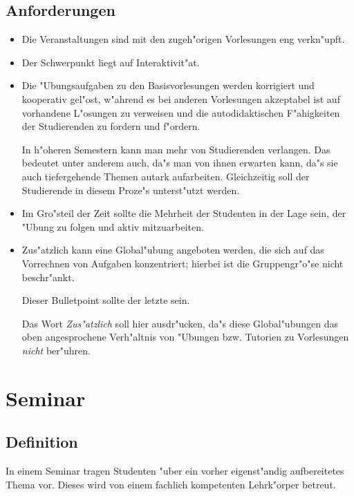 \subsection{Anforderungen}

\begin{itemize}
	\item Die Veranstaltungen sind mit den zugeh"origen Vorlesungen eng verkn"upft.
	\item Der Schwerpunkt liegt auf Interaktivit"at.
	\item Die "Ubungsaufgaben zu den Basisvorlesungen werden korrigiert und kooperativ gel"ost, w"ahrend es bei anderen
		Vorlesungen akzeptabel ist auf vorhandene L"osungen zu verweisen und die autodidaktischen F"ahigkeiten
		der Studierenden zu fordern und f"ordern.
\begin{kcmt}\begin{komacmt}
	In h"oheren Semestern kann man mehr von Studierenden verlangen. Das bedeutet unter anderem
	auch, da"s man von ihnen erwarten kann, da"s sie auch tiefergehende Themen autark aufarbeiten.
	Gleichzeitig soll der Studierende in diesem Proze"s unterst"utzt werden.
\end{komacmt}\end{kcmt}
	\item Im Gro"steil der Zeit sollte die Mehrheit der Studenten in der Lage sein, der "Ubung zu folgen und aktiv mitzuarbeiten.
	\item Zus"atzlich kann eine Global"ubung angeboten werden, die sich auf das Vorrechnen von Aufgaben konzentriert;
		hierbei ist die Gruppengr"o"se nicht beschr"ankt.
\begin{kcmt}\begin{komacmt}
	Dieser Bulletpoint sollte der letzte sein.

	Das Wort \emph{Zus"atzlich} soll hier ausdr"ucken, da"s diese Global"ubungen das oben
	angesprochene Verh"altnis von "Ubungen bzw. Tutorien zu Vorlesungen \emph{nicht} ber"uhren.
\end{komacmt}\end{kcmt}
	
\end{itemize}

\section{Seminar}

\subsection{Definition} 
	In einem Seminar tragen Studenten "uber ein vorher eigenst"andig aufbereitetes Thema vor. Dieses wird
	von einem fachlich kompetenten Lehrk"orper betreut.

